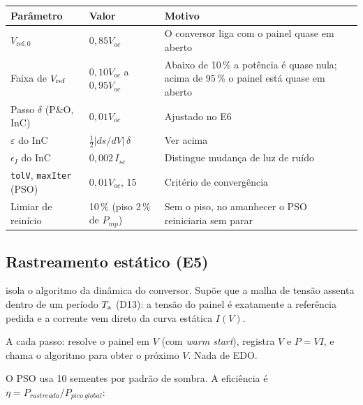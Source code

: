 
\begin{center}\small
\begin{tabularx}{\textwidth}{@{}lp{3.6cm}X@{}}
\toprule
Par\^ametro & Valor & Motivo \\ \midrule
$V_{\mathrm{ref},0}$ & $0{,}85V_{oc}$ & O conversor liga com o painel quase em aberto \\
Faixa de $V_{\mathrm{ref}}$ & $0{,}10V_{oc}$ a $0{,}95V_{oc}$ & Abaixo de 10\,\% a pot\^encia \'e quase nula; acima de 95\,\% o painel est\'a quase em aberto \\
Passo $\delta$ (P\&O, InC) & $0{,}01V_{oc}$ & Ajustado no E6 \\
$\varepsilon$ do InC & $\tfrac12|ds/dV|\,\delta$ & Ver acima \\
$\epsilon_I$ do InC & $0{,}002\,I_{sc}$ & Distingue mudan\c{c}a de luz de ru\'ido \\
\texttt{tolV}, \texttt{maxIter} (PSO) & $0{,}01V_{oc}$, 15 & Crit\'erio de converg\^encia \\
Limiar de rein\'icio & 10\,\% (piso 2\,\% de $P_{mp}$) & Sem o piso, no amanhecer o PSO reiniciaria sem parar \\
\bottomrule
\end{tabularx}
\end{center}

\subsection{Rastreamento est\'atico (E5)}

 isola o algoritmo da din\^amica do conversor. Sup\~oe que a malha de tens\~ao assenta dentro de um per\'iodo $T_{\mathrm{a}}$ (D13): a tens\~ao do painel \'e exatamente a
refer\^encia pedida e a corrente vem direto da curva est\'atica $I(V)$.


\begin{logica}
A cada passo: resolve o painel em $V$ (com \emph{warm start}), registra $V$ e $P=VI$, e chama o algoritmo para obter o pr\'oximo $V$. Nada de EDO.
\end{logica}

O PSO usa 10 sementes por padr\~ao de sombra. A efici\^encia \'e $\eta=P_{rastreada}/P_{pico\ global}$:

